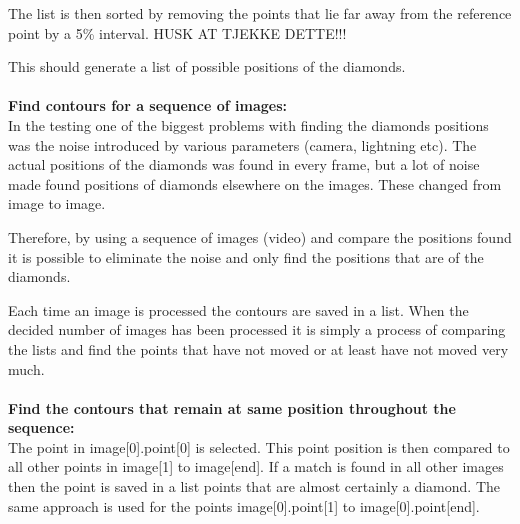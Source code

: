 The list is then sorted by removing the points that lie far away from the reference point by a 5\% interval. HUSK AT TJEKKE DETTE!!!

This should generate a list of possible positions of the diamonds.\\
\\
\textbf{Find contours for a sequence of images:}\\
In the testing one of the biggest problems with finding the diamonds positions was the noise introduced by various parameters (camera, lightning etc). The actual positions of the diamonds was found in every frame, but a lot of noise made found positions of diamonds elsewhere on the images. These changed from image to image.

Therefore, by using a sequence of images (video) and compare the positions found it is possible to eliminate the noise and only find the positions that are of the diamonds.

Each time an image is processed the contours are saved in a list. When the decided number of images has been processed it is simply a process of comparing the lists and find the points that have not moved or at least have not moved very much.\\
\\
\textbf{Find the contours that remain at same position throughout the sequence:}\\
The point in image[0].point[0] is selected. This point position is then compared to all other points in image[1] to image[end]. If a match is found in all other images then the point is saved in a list points that are almost certainly a diamond. The same approach is used for the points image[0].point[1] to image[0].point[end].
